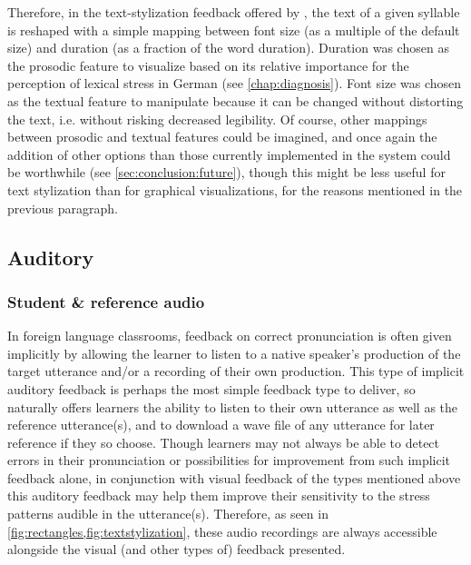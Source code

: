 		
		Therefore, in the text-stylization feedback offered by , the text of a given syllable is reshaped with a simple mapping between font size (as a multiple of the default size) and duration (as a fraction of the word duration). Duration was chosen as the prosodic feature to visualize based on its relative importance for the perception of lexical stress in German (see \cref{chap:diagnosis}). Font size was chosen as the textual feature to manipulate because it can be changed without distorting the text, i.e. without risking decreased legibility. Of course, other mappings between prosodic and textual features could be imagined, and once again the addition of other options than those currently implemented in the system could be worthwhile (see \cref{sec:conclusion:future}), though this might be less useful for text stylization than for  graphical visualizations, for the reasons mentioned in the previous paragraph.
		
			
			
		\subsection{Auditory}
		\label{sec:implicit:auditory}		
		
			\subsubsection{Student \& reference audio}
			\label{sec:implicit:auditory:basic}
			In foreign language classrooms, feedback on correct pronunciation is often given implicitly by
allowing the learner to listen to a native speaker's production of the target utterance and/or a recording of their own production. This type of implicit auditory feedback is perhaps the most simple feedback type to deliver, so  naturally offers learners the ability to listen to their own utterance as well as the reference utterance(s), and to download a wave file of any utterance for later reference if they so choose. Though learners may not always be able to detect errors in their pronunciation or possibilities for improvement from such implicit feedback alone, in conjunction with visual feedback of the types mentioned above this auditory feedback may help them improve their sensitivity to the stress patterns audible in the utterance(s). Therefore, as seen in \cref{fig:rectangles,fig:textstylization}, these audio recordings are always accessible alongside the visual (and other types of) feedback presented.
			
